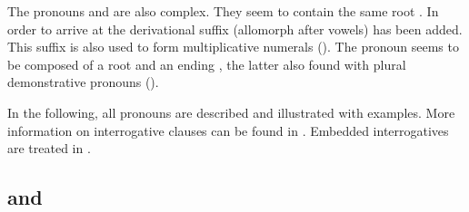 The pronouns  and  are also complex. They seem to contain the same root . In order to arrive at  the derivational suffix  (allomorph \mbox{} after vowels) has been added. This suffix is also used to form multiplicative numerals (). The pronoun  seems to be composed of a root  and an ending , the latter also found with plural demonstrative pronouns ().

In the following, all pronouns are described and illustrated with examples. More information on interrogative clauses can be found in . Embedded interrogatives are treated in .



\subsection{  and  }
\label{ssec:ca who and ce what}


